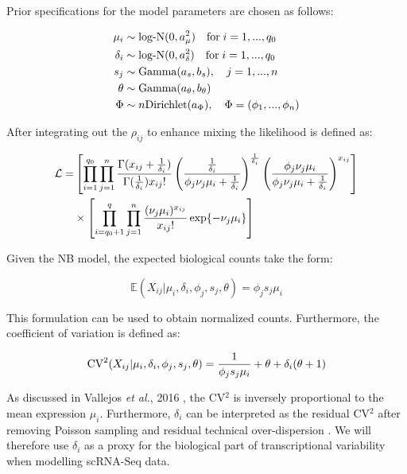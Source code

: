 Prior specifications for the model parameters are chosen as follows:

\begin{align*}
\mu_i&\sim\textnormal{log-N}(0,a_\mu^2) \quad \textnormal{for}\;{}i=1,...,q_0\\
\delta_i&\sim\textnormal{log-N}(0,a_\delta^2) \quad \textnormal{for}\;{}i=1,...,q_0\\
s_j&\sim\textnormal{Gamma}(a_s,b_s), \quad j=1,...,n\\
\theta&\sim\textnormal{Gamma}(a_\theta,b_\theta)\\
\Phi&\sim{}n\textnormal{Dirichlet}(a_\Phi), \quad \Phi=(\phi_1,...,\phi_n)
\end{align*}

After integrating out the $\rho_{ij}$ to enhance mixing \citep{Vallejos2015BASiCS} the likelihood is defined as:

\begin{align} 
\mathcal{L} = & \left[\prod_{i=1}^{q_0}\prod_{j=1}^n\frac{\Gamma(x_{ij}+\frac{1}{\delta_i})}{\Gamma(\frac{1}{\delta_i})x_{ij}!}\left(\frac{\frac{1}{\delta_i}}{\phi_j\nu_j\mu_i+\frac{1}{\delta_i}}\right)^\frac{1}{\delta_i}\left(\frac{\phi_j\nu_j\mu_i}{\phi_j\nu_j\mu_i+\frac{1}{\delta_i}}\right)^{x_{ij}}\right] \nonumber\\ 
&\times\left[\prod_{i=q_0+1}^{q}\prod_{j=1}^n\frac{(\nu_j\mu_i)^{x_{ij}}}{x_{ij}!}\exp\lbrace-\nu_j\mu_i\rbrace\right]
\end{align} 

\newpage

Given the NB model, the expected biological counts take the form:

\begin{equation}
\mathbb{E}(X_{ij}|\mu_i,\delta_i,\phi_j,s_j,\theta)=\phi_js_j\mu_i
\end{equation}

This formulation can be used to obtain normalized counts. Furthermore, the coefficient of variation is defined as:

\begin{equation}
\textnormal{CV}^2(X_{ij}|\mu_i,\delta_i,\phi_j,s_j,\theta)=\frac{1}{\phi_js_j\mu_i} + \theta + \delta_i(\theta + 1)
\end{equation}

As discussed in Vallejos \emph{et al.}, 2016 \citep{Vallejos2016}, the CV$^2$ is inversely proportional to the mean expression $\mu_i$. Furthermore, $\delta_i$ can be interpreted as the residual CV$^2$ after removing Poisson sampling and residual technical over-dispersion \citep{Vallejos2015BASiCS, Vallejos2016}. We will therefore use $\delta_i$ as a proxy for the biological part of transcriptional variability when modelling scRNA-Seq data.\\

